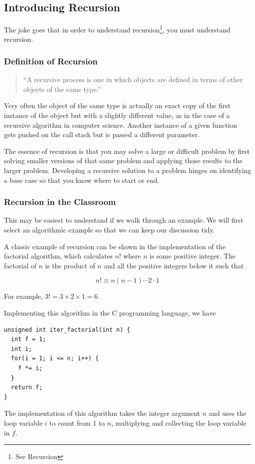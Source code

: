 \documentclass[jou,apacite]{apa6}
\begin{document}
\subsection{Introducing Recursion}  %
The joke goes that in order to understand recursion\footnote{See Recursion}, you must understand recursion.

\subsubsection{Definition of Recursion} %
    \begin{quote}
      ``A recursive process is one in which objects are defined in terms of other objects of the same type.''~\cite{Wolfram} 
    \end{quote}
    Very often the object of the same type is actually an exact copy of the first instance of the object but with a slightly different value, as in the case of a recursive algorithm in computer science.  Another instance of a given function gets pushed on the call stack but is passed a different parameter.

    The essence of recursion is that you may solve a large or difficult problem by first solving smaller versions of that same problem and applying those results to the larger problem.  Developing a recursive solution to a problem hinges on identifying a base case so that you know where to start or end. 

\subsubsection{Recursion in the Classroom}   %
This may be easiest to understand if we walk through an example.  We will first select an algorithmic example so that we can keep our discussion tidy.

A classic example of recursion can be shown in the implementation of the factorial algorithm, which calculates $n!$ where $n$ is some positive integer.  The factorial of $n$ is the product of $n$ and all the positive integers below it such that  

\[n!\equiv n(n-1)\cdots 2\cdot 1\]

For example, $3! = 3\times2\times1 = 6$.

Implementing this algorithm in the C programming language, we have
\begin{verbatim}
unsigned int iter_factorial(int n) {
  int f = 1;
  int i;
  for(i = 1; i <= n; i++) {
    f *= i;
  }
  return f;
}
\end{verbatim}
The implementation of this algorithm takes the integer argument $n$ and uses the loop variable $i$ to count from 1 to $n$, multiplying and collecting the loop variable in $f$.
\end{document}
